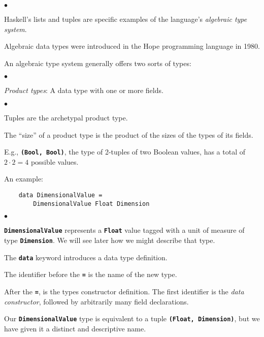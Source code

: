\documentclass[12pt]{article}
\newcommand\code[1]{\texttt{\textbf{#1}}}
\newenvironment{notelist}{\begin{list}
   {$\bullet$}
   {\setlength{\itemsep}{0in}}}
   {\end{list}}
\begin{document}
\begin{notelist}
\item Haskell's lists and tuples are specific examples of the language's \textit{algebraic type system}.
\item Algebraic data types were introduced in the Hope programming language in 1980. \cite{hope}
\item An algebraic type system generally offers two sorts of types:
\begin{notelist}
    \item \textit{Product types}: A data type with one or more fields.
    \begin{notelist}
        \item Tuples are the archetypal product type.
        \item The ``size'' of a product type is the product of the sizes of the types of its fields.
        \item E.g., \code{(Bool, Bool)}, the type of 2-tuples of two Boolean values, has a total of $2 \cdot 2 = 4$ 
              possible values.
    \end{notelist}
    \item An example:
    \begin{lstlisting}
    data DimensionalValue =
        DimensionalValue Float Dimension
    \end{lstlisting}
    \begin{notelist}
        \item \code{DimensionalValue} represents a \code{Float} value tagged with a unit of measure
              of type \code{Dimension}. We will see later how we might describe that type.
        \item The \code{data} keyword introduces a data type definition.
        \item The identifier before the \code{=} is the name of the new type.
        \item After the \code{=}, is the types constructor definition. The first identifier is the
              \textit{data constructor}, followed by arbitrarily many field declarations. 
        \item Our \code{DimensionalValue} type is equivalent to a tuple \code{(Float, Dimension)},
              but we have given it a distinct and descriptive name.
    \end{notelist}
    

\end{notelist}
\end{notelist}
\end{document}
